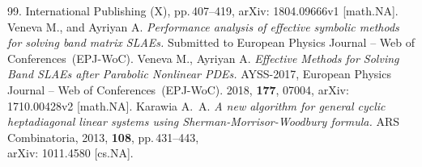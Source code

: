 \documentclass[11pt, a4paper]{article}
\begin{document}
\begin{thebibliography}{99.}
    International Publishing (X), pp.\,407--419, arXiv: 1804.09666v1 [math.NA].
    Veneva M., and Ayriyan A. {\it Performance analysis of effective symbolic
    methods for solving band matrix SLAEs.} Submitted to European Physics
    Journal -- Web of Conferences~(EPJ-WoC).
    Veneva M., Ayriyan A. {\it Effective Methods for Solving Band SLAEs after
    Parabolic Nonlinear PDEs.} AYSS-2017, European Physics Journal -- Web of
    Conferences~(EPJ-WoC). 2018, \textbf{177}, 07004, arXiv: 1710.00428v2
    [math.NA].
 Karawia A.~A. {\it A new algorithm for general cyclic
    heptadiagonal linear systems using Sherman-Morrisor-Woodbury formula.}
    {ARS} Combinatoria, 2013, \textbf{108}, pp.\,431--443, \\
    arXiv: 1011.4580 [cs.NA].
\end{thebibliography}
\end{document}
